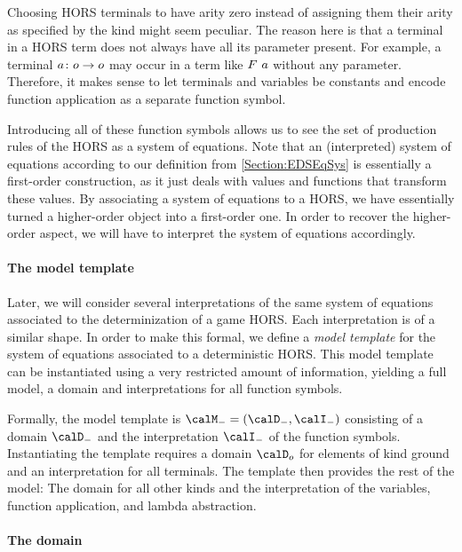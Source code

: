 \documentclass[../../diss.tex]{subfiles}
\begin{document}
Choosing HORS terminals to have arity zero instead of assigning them their arity as specified by the kind might seem peculiar.
The reason here is that a terminal in a HORS term does not always have all its parameter present.
For example, a terminal $a \colon o \to o$ may occur in a term like $F\  a$ without any parameter.
Therefore, it makes sense to let terminals and variables be constants and encode function application as a separate function symbol.

Introducing all of these function symbols allows us to see the set of production rules of the HORS as a system of equations.
Note that an (interpreted) system of equations according to our definition from \cref{Section:EDSEqSys} is essentially a first-order construction, as it just deals with values and functions that transform these values.
By associating a system of equations to a HORS, we have essentially turned a higher-order object into a first-order one.
In order to recover the higher-order aspect, we will have to interpret the system of equations accordingly.

\paragraph{The model template}

Later, we will consider several interpretations of the same system of equations associated to the determinization of a game HORS.\@
Each interpretation is of a similar shape.
In order to make this formal, we define a \emph{model template} for the system of equations associated to a deterministic HORS.\@
This model template can be instantiated using a very restricted amount of information, yielding a full model, \ie a domain and interpretations for all function symbols.

Formally, the model template is $\modelt = (\domaint,\interpretationt)$ consisting of a domain $\domaint$ and the interpretation $\interpretationt$ of the function symbols.
Instantiating the template requires a domain $\domain{\ground}$ for elements of kind ground and an interpretation for all terminals.
The template then provides the rest of the model:
The domain for all other kinds and the interpretation of the variables, function application, and lambda abstraction.

\paragraph{The domain}
\end{document}
